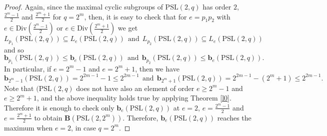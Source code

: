 \documentclass{amsart}
\theoremstyle{definition}
\numberwithin{equation}{section}
\begin{document}
\begin{proof}
Again, since the maximal cyclic subgroups of $\mathrm{PSL}(2,q)$ has order $2$, $\frac{2^m-1}{2}$ and $\frac{2^m+1}{2}$ for $q=2^m$, then, it is easy to check that for $e=p_1p_2$ with $e\in \mathrm{Div}(\frac{2^m-1}{2})$ or $e\in \mathrm{Div}(\frac{2^m+1}{2})$ we get   
\begin{equation} \label{eqcompa2}
     L_{p_1}(\mathrm{PSL}(2,q))\subseteq L_{e}(\mathrm{PSL}(2,q)) \ \ \mbox{and} \ \  L_{p_2}(\mathrm{PSL}(2,q))\subseteq L_{e}(\mathrm{PSL}(2,q)) 
\end{equation} and so
\begin{equation}
\mathbf{b}_{p_1}(\mathrm{PSL}(2,q)) \leq \mathbf{b}_{e}(\mathrm{PSL}(2,q)) \ \ \mbox{and} \ \  \mathbf{b}_{p_2}(\mathrm{PSL}(2,q)) \leq \mathbf{b}_{e}(\mathrm{PSL}(2,q)). 
\end{equation}
In particular, if $e=2^m-1$  and $e=2^m+1$, then we have
\begin{equation}
    \mathbf{b}_{2^m-1}(\mathrm{PSL}(2,q))= 2^{2m-1}-1\leq 2^{2m-1}
\ \ \mathrm{and} \ \ 
    \mathbf{b}_{2^m+1}(\mathrm{PSL}(2,q))= 2^{2m-1}-(2^m+1)\leq 2^{2m-1}.
\end{equation}
Note that $(\mathrm{PSL}(2,q)$ does not have also an element of order $e\ge 2^{m}-1$ and $e\ge 2^m+1$, and the above inequality holds true by applying Theorem \ref{l0}.
Therefore it is enough to check only $\mathbf{b}_e(\mathrm{PSL}(2,q))$ at $e=2$, $e=\frac{2^m-1}{2}$ and $e=\frac{2^m+1}{2}$ to obtain $\mathbf{B}(\mathrm{PSL}(2,2^m))$. 
Therefore, $\mathbf{b}_e(\mathrm{PSL}(2,q))$  reaches the maximum when $e=2$, in case $q=2^m$.


\end{proof}
\end{document}
